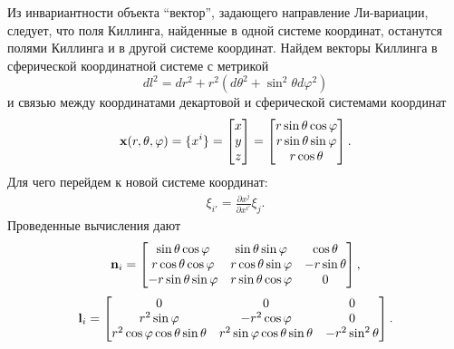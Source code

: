 \documentclass[12pt,a4paper]{article}
\begin{document}
        Из инвариантности объекта \enquote{вектор}, задающего направление Ли-вариации, следует, что поля Киллинга, найденные в одной системе координат, останутся полями Киллинга и в другой системе координат. Найдем векторы Киллинга в сферической координатной системе с метрикой
        \begin{equation}
            dl^2 = dr^2 + r^2 (d\theta^2 + \sin ^2 \theta d\varphi^2)
        \end{equation}
        и связью между координатами декартовой и сферической системами координат
        \begin{equation}
            \mathbf{x}(r, \theta, \varphi)
            =
            \{x^i\}
            =
            \begin{bmatrix}
                x \\ y \\ z
            \end{bmatrix}
            =
            \begin{bmatrix}
                r \sin\theta \cos\varphi \\
                r \sin\theta \sin\varphi \\
                r \cos\theta
            \end{bmatrix}
            .
        \end{equation}
        Для чего перейдем к новой системе координат:
        \begin{equation}\begin{aligned}
            \xi_{i'} = \frac{\partial x^j}{\partial x^{i'}} \xi_j.
        \end{aligned}\end{equation}
        Проведенные вычисления дают
        \begin{equation}
            \mathbf{n}_i
            =
            \begin{bmatrix}
                \sin\theta \cos\varphi     & \sin\theta \sin\varphi   & \cos\theta \\
                r \cos\theta \cos\varphi   & r \cos\theta \sin\varphi & - r \sin\theta \\
                - r \sin\theta \sin\varphi & r \sin\theta \cos\varphi & 0
            \end{bmatrix}
            ,
        \end{equation}
        \begin{equation}
            \mathbf{l}_i
            =
            \begin{bmatrix}
                0
                    & 0
                    & 0 \\
                r^2 \sin\varphi
                    & - r^2 \cos\varphi
                    & 0 \\
                r^2 \cos\varphi \cos\theta \sin\theta
                    & r^2 \sin\varphi \cos\theta \sin\theta
                    & - r^2 \sin^2\theta
            \end{bmatrix}
            .
        \end{equation}
\end{document}
